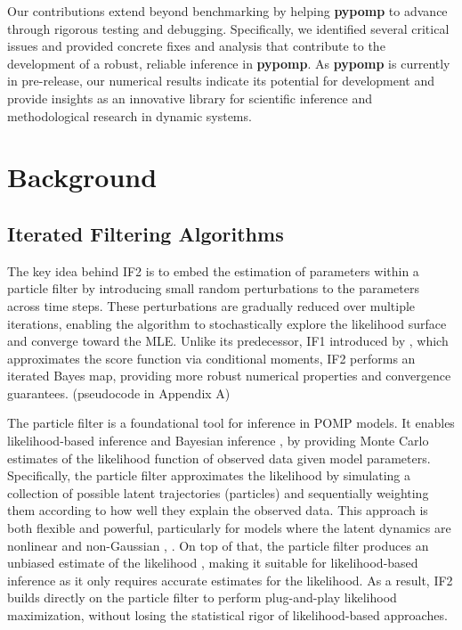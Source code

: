 \documentclass[11pt]{report}
\begin{document}
Our contributions extend beyond benchmarking by helping \textbf{pypomp} to advance through rigorous testing and debugging. Specifically, we identified several critical issues and provided concrete fixes and analysis that contribute to the development of a robust, reliable inference in \textbf{pypomp}. As \textbf{pypomp} is currently in pre-release, our numerical results indicate its potential for development and provide insights as an innovative library for scientific inference and methodological research in dynamic systems.


\chapter{Background}\label{chap:background}

\section{Iterated Filtering Algorithms}
The key idea behind IF2 is to embed the estimation of parameters within a particle filter by introducing small random perturbations to the parameters across time steps. These perturbations are gradually reduced over multiple iterations, enabling the algorithm to stochastically explore the likelihood surface and converge toward the MLE. Unlike its predecessor, IF1 introduced by \citet{ionides2011iterated}, which approximates the score function via conditional moments, IF2 performs an iterated Bayes map, providing more robust numerical properties and convergence guarantees. (pseudocode in Appendix A)

The particle filter is a foundational tool for inference in POMP models. It enables likelihood-based inference \citep{ionides2006inference} and Bayesian inference \citep{chopin2013smc2}, \citep{andrieu2010particle} by providing Monte Carlo estimates of the likelihood function of observed data given model parameters. Specifically, the particle filter approximates the likelihood by simulating a collection of possible latent trajectories (particles) and sequentially weighting them according to how well they explain the observed data. This approach is both flexible and powerful, particularly for models where the latent dynamics are nonlinear and non-Gaussian \citep{arulampalam2002tutorial}, \citep{kitagawa1987non}. On top of that, the particle filter produces an unbiased estimate of the likelihood \citep{doucet2001sequential}, making it suitable for likelihood-based inference as it only requires accurate estimates for the likelihood. As a result, IF2 builds directly on the particle filter to perform plug-and-play likelihood maximization, without losing the statistical rigor of likelihood-based approaches.
\end{document}
